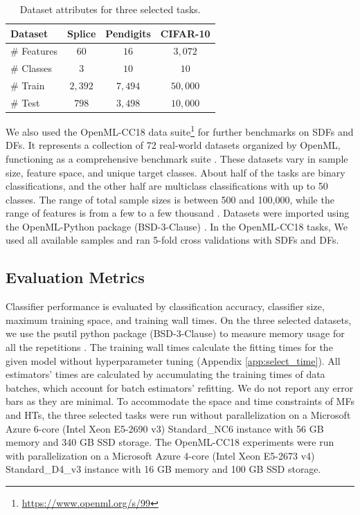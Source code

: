 \begin{table}[htb]
\centering
\begin{tabular}{lccc} 
\hline
Dataset & \textbf{Splice} & \textbf{Pendigits} & \textbf{CIFAR-10} \\
\hline
\# Features & $60$ & $16$ & $3,072$ \\
\hline
\# Classes & $3$ & $10$ & $10$ \\
\hline
\# Train & $2,392$ & $7,494$ & $50,000$ \\
\hline
\# Test & $798$ & $3,498$ & $10,000$ \\
\hline
\end{tabular}
\caption{Dataset attributes for three selected tasks.}
\label{table:data}
\end{table}

We also used the OpenML-CC18 data suite\footnote{\url{https://www.openml.org/s/99}} for further benchmarks on SDFs and DFs. It represents a collection of 72 real-world datasets organized by OpenML, functioning as a comprehensive benchmark suite \citep{vanschoren_openml_2013, bischl_openml_2019}. These datasets vary in sample size, feature space, and unique target classes.
About half of the tasks are binary classifications, and the other half are multiclass classifications with up to 50 classes. The range of total sample sizes is between 500 and 100,000, while the range of features is from a few to a few thousand \citep{bischl_openml_2019}.
Datasets were imported using the OpenML-Python package (BSD-3-Clause) \citep{feurer_openml-python_2019}. In the OpenML-CC18 tasks, We used all available samples and ran 5-fold cross validations with SDFs and DFs.

\subsection{Evaluation Metrics}
Classifier performance is evaluated by classification accuracy, classifier size, maximum training space, and training wall times. 
On the three selected datasets, we use the psutil python package (BSD-3-Clause) to measure memory usage for all the repetitions
\citep{rodola_giampaolopsutil_2022}.
The training wall times calculate the fitting times for the given model without hyperparameter tuning (Appendix \ref{app:select_time}). All estimators' times are calculated by accumulating the training times of data batches, which account for batch estimators' refitting. We do not report any error bars as they are minimal. 
To accommodate the space and time constraints of MFs and HTs, the three selected tasks were run without parallelization on a Microsoft Azure 6-core (Intel Xeon E5-2690 v3) Standard\_NC6 instance with 56 GB memory and 340 GB SSD storage.
The OpenML-CC18 experiments were run with parallelization on a Microsoft Azure 4-core (Intel Xeon E5-2673 v4) Standard\_D4\_v3 instance with 16 GB memory and 100 GB SSD storage.

